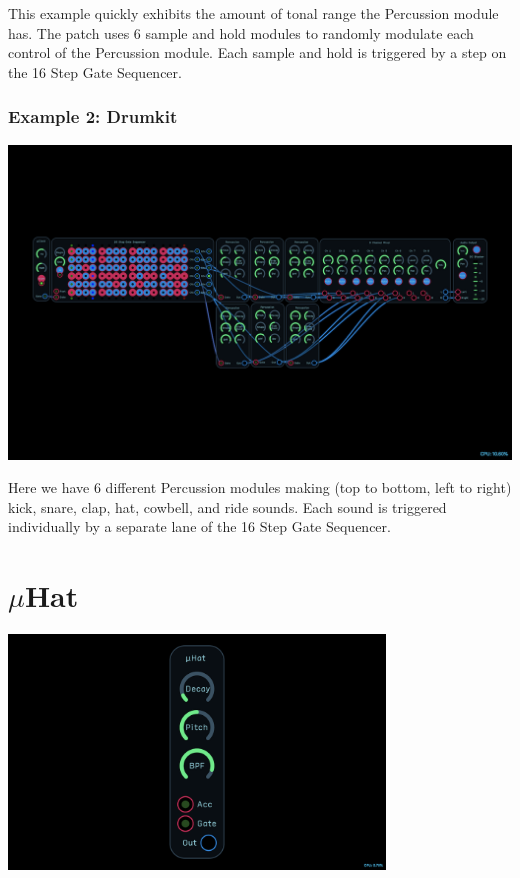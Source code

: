 \documentclass[11pt]{book}
\begin{document}
\begin{multicols*}{2}
This example quickly exhibits the amount of tonal range the Percussion module has. The patch uses 6 sample and hold modules to randomly modulate each control of the Percussion module. Each sample and hold is triggered by a step on the 16 Step Gate Sequencer.

\subsubsection*{Example 2: Drumkit}

\begin{center}
\includegraphics[width=0.95\linewidth]{percussion-fig2.png}
\end{center}

Here we have 6 different Percussion modules making (top to bottom, left to right) kick, snare, clap, hat, cowbell, and ride sounds. Each sound is triggered individually by a separate lane of the 16 Step Gate Sequencer.

\end{multicols*}

\pagebreak


\section{$\mu$Hat}

\begin{center}
\includegraphics[width=0.75\textwidth]{uhat.png}
\end{center}
\end{document}
